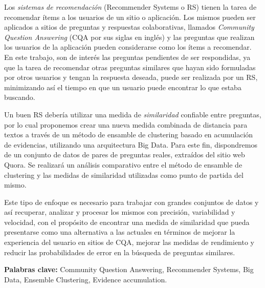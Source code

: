 \abstract

\noindent Los \textit{sistemas de recomendación} (Recommender Systems o RS) tienen la tarea de recomendar ítems a los usuarios de un sitio o aplicación. Los mismos pueden ser aplicados a sitios de preguntas y respuestas colaborativas, llamados \textit{Community Question Answering} (CQA por sus siglas en inglés) y las preguntas que realizan los usuarios de la aplicación pueden considerarse como los ítems a recomendar. En este trabajo, son de interés las preguntas pendientes de ser respondidas, ya que la tarea de recomendar otras preguntas similares que hayan sido formuladas por otros usuarios y tengan la respuesta deseada, puede ser realizada por un RS, minimizando así el tiempo en que un usuario puede encontrar lo que estaba buscando.

\bigskip Un buen RS debería utilizar una medida de \textit{similaridad} confiable entre preguntas, por lo cual proponemos crear una nueva medida combinada de distancia para textos a través de un método de ensamble de clustering basado en acumulación de evidencias, utilizando una arquitectura Big Data. Para este fin, dispondremos de un conjunto de datos de pares de preguntas reales, extraídos del sitio web Quora. Se realizará un análisis comparativo entre el método de ensamble de clustering y las medidas de similaridad utilizadas como punto de partida del mismo.

\bigskip Este tipo de enfoque es necesario para trabajar con grandes conjuntos de datos y así recuperar, analizar y procesar los mismos con precisión, variabilidad y velocidad, con el propósito de encontrar una medida de similaridad que pueda presentarse como una alternativa a las actuales en términos de mejorar la experiencia del usuario en sitios de CQA, mejorar las medidas de rendimiento y reducir las probabilidades de error en la búsqueda de preguntas similares.

\bigskip

\noindent\textbf{Palabras clave:}  Community Question Answering, Recommender Systems, Big Data, Ensemble Clustering, Evidence accumulation.